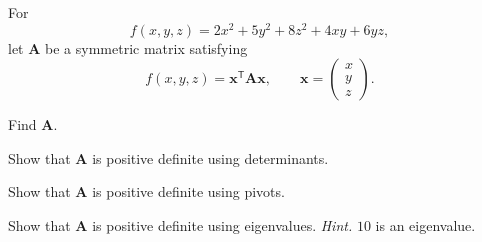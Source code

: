 \documentclass[11pt,oneside]{article}
\begin{document}
\begin{problem}
For
\[
f(x,y,z)=2x^2+5y^2+8z^2+4xy+6yz,
\]
let $\mathbf A$ be a symmetric matrix satisfying
\[
f(x,y,z)=\mathbf x^{\mathsf T}\mathbf A\mathbf x,
\qquad
\mathbf x=
\begin{pmatrix}
x\\y\\z
\end{pmatrix}.
\]
\begin{problemsubparts}
\item Find $\mathbf A$.
\item Show that $\mathbf A$ is positive definite using determinants.
\item Show that $\mathbf A$ is positive definite using pivots.
\item Show that $\mathbf A$ is positive definite using eigenvalues. \textit{Hint.} $10$ is an eigenvalue.
\end{problemsubparts}
\end{problem}
\end{document}
